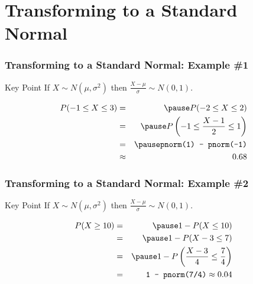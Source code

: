 \section{Transforming to a Standard Normal}
\begin{frame}[t]
  \frametitle{Transforming to a Standard Normal: Example \#1}

  \vspace{1em}

  \begin{alertblock}{Key Point}
    If $X \sim N(\mu, \sigma^2)$ then $\frac{X - \mu}{\sigma} \sim N(0,1)$.
  \end{alertblock}

  \begin{eqnarray*}
    P(-1 \leq X \leq 3) &=& \pause P(-2 \leq X \leq 2) \\
    &=& \pause P\left( -1 \leq \frac{X - 1}{2} \leq 1 \right)\\
    &=& \pause \texttt{pnorm(1) - pnorm(-1)}\\
    &\approx& 0.68
  \end{eqnarray*}

\end{frame}
\begin{frame}[t]
  \frametitle{Transforming to a Standard Normal: Example \#2}


  \vspace{1em}

  \begin{alertblock}{Key Point}
    If $X \sim N(\mu, \sigma^2)$ then $\frac{X - \mu}{\sigma} \sim N(0,1)$.
  \end{alertblock}

  \begin{eqnarray*}
    P(X \geq 10) &=& \pause 1 - P(X \leq 10)\\
    &=& \pause 1 - P(X - 3 \leq 7) \\
    &=& \pause 1 - P\left( \frac{X - 3}{4} \leq \frac{7}{4} \right)\\
    &=& \texttt{1 - pnorm(7/4)} \approx 0.04
  \end{eqnarray*}

\end{frame}
